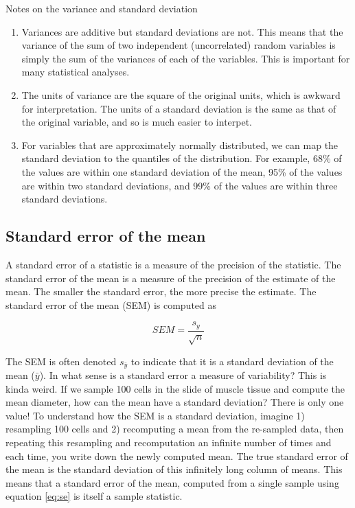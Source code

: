 \documentclass[]{book}
\providecommand{\tightlist}{%
  \setlength{\itemsep}{0pt}\setlength{\parskip}{0pt}}
\begin{document}
Notes on the variance and standard deviation

\begin{enumerate}
\def\labelenumi{\arabic{enumi}.}
\tightlist
\item
  Variances are additive but standard deviations are not. This means
  that the variance of the sum of two independent (uncorrelated) random
  variables is simply the sum of the variances of each of the variables.
  This is important for many statistical analyses.
\item
  The units of variance are the square of the original units, which is
  awkward for interpretation. The units of a standard deviation is the
  same as that of the original variable, and so is much easier to
  interpet.
\item
  For variables that are approximately normally distributed, we can map
  the standard deviation to the quantiles of the distribution. For
  example, 68\% of the values are within one standard deviation of the
  mean, 95\% of the values are within two standard deviations, and 99\%
  of the values are within three standard deviations.
\end{enumerate}

\subsection{Standard error of the
mean}\label{standard-error-of-the-mean}

A standard error of a statistic is a measure of the precision of the
statistic. The standard error of the mean is a measure of the precision
of the estimate of the mean. The smaller the standard error, the more
precise the estimate. The standard error of the mean (SEM) is computed
as

\begin{equation}
SEM = \frac{s_y}{\sqrt{n}}
\label{eq:se}
\end{equation}

The SEM is often denoted \(s_{\bar{y}}\) to indicate that it is a
standard deviation of the mean (\(\bar{y}\)). In what sense is a
standard error a measure of variability? This is kinda weird. If we
sample 100 cells in the slide of muscle tissue and compute the mean
diameter, how can the mean have a standard deviation? There is only one
value! To understand how the SEM is a standard deviation, imagine 1)
resampling 100 cells and 2) recomputing a mean from the re-sampled data,
then repeating this resampling and recomputation an infinite number of
times and each time, you write down the newly computed mean. The true
standard error of the mean is the standard deviation of this infinitely
long column of means. This means that a standard error of the mean,
computed from a single sample using equation \eqref{eq:se} is itself a
sample statistic.
\end{document}
